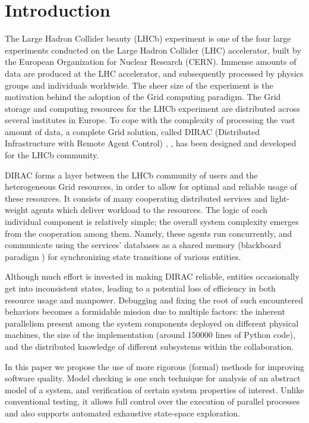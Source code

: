 \documentclass[10pt,conference]{IEEEtran}
\begin{document}
\section{Introduction}

The Large Hadron Collider beauty (LHCb) experiment \cite{LHCb} is one of the
four large
experiments conducted on the Large Hadron Collider (LHC) accelerator, built by
the European Organization for Nuclear Research (CERN). Immense amounts of data
are produced at the LHC accelerator, and subsequently processed by physics
groups and individuals worldwide. The sheer size of the experiment is the
motivation behind the adoption of the Grid computing paradigm. The Grid storage
and computing resources for the LHCb experiment are distributed across several
institutes in Europe. To cope with the complexity of processing the vast amount
of data, a complete Grid solution, called DIRAC (Distributed Infrastructure with
Remote Agent Control) \cite{DIRAC_CommGridSolution},
\cite{DIRAC_ReliableDataMaangement}, has been designed and developed for the
LHCb
community.

DIRAC forms a layer between the LHCb community of users and the heterogeneous
Grid resources, in order to allow for optimal and reliable usage of these
resources. It consists of many cooperating distributed services and light-weight
agents which deliver workload to the resources. The logic of each individual
component is relatively simple; the overall system complexity emerges from the
cooperation among them. Namely, these agents run concurrently, and communicate
using the services' databases as a shared memory (blackboard paradigm \cite{IEEEexample:blackboard_systems}) for
synchronizing state transitions of various entities.

Although much effort is invested in making DIRAC reliable, entities occasionally
get into inconsistent states, leading to a potential loss of efficiency in both
resource usage and manpower. Debugging and fixing the root of such encountered
behaviors becomes a formidable mission due to multiple factors: the inherent
parallelism present among the system components deployed on different physical
machines, the size of the implementation (around 150000 lines of Python code),
and the distributed knowledge of different subsystems within the collaboration.

In this paper we propose the use of more rigorous (formal) methods for improving
software quality. Model checking \cite{ProcessesWithData} is one such technique for analysis of an
abstract model of a system, and verification of certain system properties of
interest. Unlike conventional testing, it allows full control over the execution
of parallel processes and also supports automated exhaustive state-space
exploration.
\end{document}

